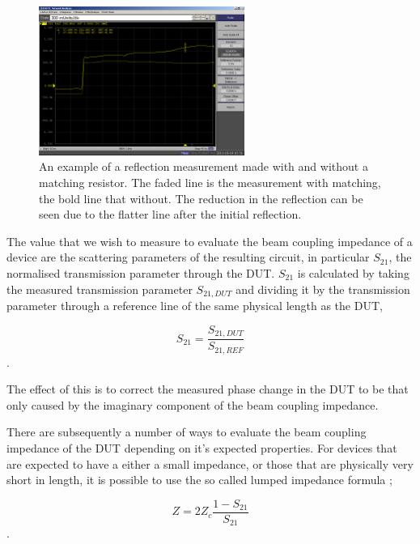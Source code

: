 \documentclass[review, number, sort&compress]{elsarticle}
\begin{document}
\begin{figure}
\begin{center}
\includegraphics[width=0.6\textwidth]{figures/coax-matching-no-matching.png}
\end{center}
\caption{An example of a reflection measurement made with and without a matching resistor. The faded line is the measurement with matching, the bold line that without. The reduction in the reflection can be seen due to the flatter line after the initial reflection.}
\label{fig:matching-plot}
\end{figure}

The value that we wish to measure to evaluate the beam coupling impedance of a device are the scattering parameters of the resulting circuit, in particular $S_{21}$, the normalised transmission parameter through the DUT. $S_{21}$ is calculated by taking the measured transmission parameter $S_{21,DUT}$ and dividing it by the transmission parameter through a reference line of the same physical length as the DUT,

\begin{equation}
S_{21} = \frac{S_{21,DUT}}{S_{21,REF}}
\end{equation}.

The effect of this is to correct the measured phase change in the DUT to be that only caused by the imaginary component of the beam coupling impedance.

There are subsequently a number of ways to evaluate the beam coupling impedance of the DUT depending on it's expected properties. For devices that are expected to have a either a small impedance, or those that are physically very short in length, it is possible to use the so called lumped impedance formula \cite{Hahn:BenchMeasInter, Hahn: ValidityImpMeas};

\begin{equation}
Z = 2Z_{c} \frac{1-S_{21}}{S_{21}}
\end{equation}.
\end{document}
